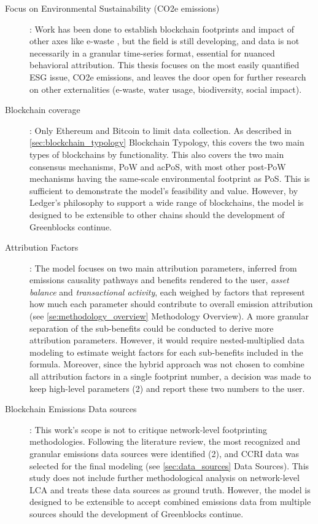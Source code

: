 \documentclass[11pt]{report}
\begin{document}
\begin{description}
    \item [Focus on Environmental Sustainability (CO2e emissions)]: Work has been done to establish blockchain footprints and impact of other axes like e-waste \cite{devriesBitcoinGrowingEwaste2021}, but the field is still developing, and data is not necessarily in a granular time-series format, essential for nuanced behavioral attribution. This thesis focuses on the most easily quantified \ac{ESG} issue, CO2e emissions, and leaves the door open for further research on other externalities (e-waste, water usage, biodiversity, social impact).
    \item [Blockchain coverage]: Only Ethereum and Bitcoin to limit data collection. As described in \ref{sec:blockchain_typology} Blockchain Typology, this covers the two main types of blockchains by functionality. This also covers the two main consensus mechanisms, \ac{PoW} and ac{PoS}, with most other post-PoW mechanisms having the same-scale environmental footprint as PoS. This is sufficient to demonstrate the model's feasibility and value. However, by Ledger's philosophy to support a wide range of blockchains, the model is designed to be extensible to other chains should the development of Greenblocks continue.
    \item [Attribution Factors]: The model focuses on two main attribution parameters, inferred from emissions causality pathways and benefits rendered to the user, \textit{asset balance} and \textit{transactional activity}, each weighed by factors that represent how much each parameter should contribute to overall emission attribution (see \ref{se:methodology_overview} Methodology Overview). A more granular separation of the sub-benefits could be conducted to derive more attribution parameters. However, it would require nested-multiplied data modeling to estimate weight factors for each sub-benefits included in the formula. Moreover, since the hybrid approach was not chosen to combine all attribution factors in a single footprint number, a decision was made to keep high-level parameters (2) and report these two numbers to the user.
    \item [Blockchain Emissions Data sources]: This work's scope is not to critique network-level footprinting methodologies. Following the literature review, the most recognized and granular emissions data sources were identified (2), and \ac{CCRI} data was selected for the final modeling (see \ref{sec:data_sources} Data Sources). This study does not include further methodological analysis on network-level LCA and treats these data sources as ground truth. However, the model is designed to be extensible to accept combined emissions data from multiple sources should the development of Greenblocks continue.

\end{description}
\end{document}
